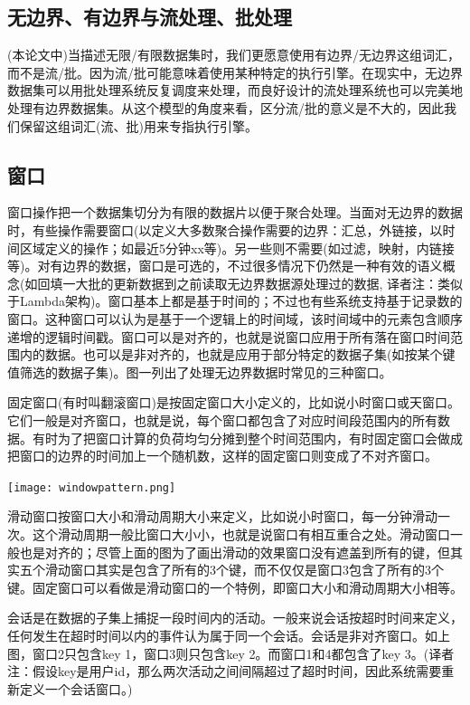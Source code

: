 \documentclass[oneside]{ctexbook}
\begin{document}
\subsection{无边界、有边界与流处理、批处理}

(本论文中)当描述无限/有限数据集时，我们更愿意使用有边界/无边界这组词汇，而不是流/批。因为流/批可能意味着使用某种特定的执行引擎。在现实中，无边界数据集可以用批处理系统反复调度来处理，而良好设计的流处理系统也可以完美地处理有边界数据集。从这个模型的角度来看，区分流/批的意义是不大的，因此我们保留这组词汇(流、批)用来专指执行引擎。

\subsection{窗口}

窗口操作把一个数据集切分为有限的数据片以便于聚合处理。当面对无边界的数据时，有些操作需要窗口(以定义大多数聚合操作需要的边界：汇总，外链接，以时间区域定义的操作；如最近5分钟xx等)。另一些则不需要(如过滤，映射，内链接等)。对有边界的数据，窗口是可选的，不过很多情况下仍然是一种有效的语义概念(如回填一大批的更新数据到之前读取无边界数据源处理过的数据, 译者注：类似于Lambda架构)。窗口基本上都是基于时间的；不过也有些系统支持基于记录数的窗口。这种窗口可以认为是基于一个逻辑上的时间域，该时间域中的元素包含顺序递增的逻辑时间戳。窗口可以是对齐的，也就是说窗口应用于所有落在窗口时间范围内的数据。也可以是非对齐的，也就是应用于部分特定的数据子集(如按某个键值筛选的数据子集)。图一列出了处理无边界数据时常见的三种窗口。

固定窗口(有时叫翻滚窗口)是按固定窗口大小定义的，比如说小时窗口或天窗口。它们一般是对齐窗口，也就是说，每个窗口都包含了对应时间段范围内的所有数据。有时为了把窗口计算的负荷均匀分摊到整个时间范围内，有时固定窗口会做成把窗口的边界的时间加上一个随机数，这样的固定窗口则变成了不对齐窗口。

\noindent \texttt{[image: windowpattern.png]}

滑动窗口按窗口大小和滑动周期大小来定义，比如说小时窗口，每一分钟滑动一次。这个滑动周期一般比窗口大小小，也就是说窗口有相互重合之处。滑动窗口一般也是对齐的；尽管上面的图为了画出滑动的效果窗口没有遮盖到所有的键，但其实五个滑动窗口其实是包含了所有的3个键，而不仅仅是窗口3包含了所有的3个键。固定窗口可以看做是滑动窗口的一个特例，即窗口大小和滑动周期大小相等。

会话是在数据的子集上捕捉一段时间内的活动。一般来说会话按超时时间来定义，任何发生在超时时间以内的事件认为属于同一个会话。会话是非对齐窗口。如上图，窗口2只包含key 1，窗口3则只包含key 2。而窗口1和4都包含了key 3。(译者注：假设key是用户id，那么两次活动之间间隔超过了超时时间，因此系统需要重新定义一个会话窗口。)
\end{document}
